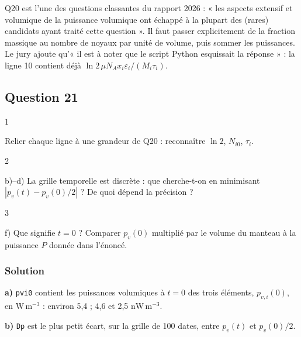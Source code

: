 \documentclass[11pt,a4paper]{article}
\begin{document}
\begin{jury}

Q20 est l'une des questions classantes du rapport 2026 : « les aspects extensif et volumique de la puissance volumique ont échappé à la plupart des (rares) candidats ayant traité cette question ». Il faut passer explicitement de la fraction massique au nombre de noyaux par unité de volume, puis sommer les puissances. Le jury ajoute qu'« il est à noter que le script Python esquissait la réponse » : la ligne 10 contient déjà \(\ln2\,\mu N_Ax_i\varepsilon_i/(M_i\tau_i)\).

\end{jury}

\hypertarget{question-21}{%
\subsection{Question 21}\label{question-21}}

\begin{indication}{1}

Relier chaque ligne à une grandeur de Q20 : reconnaître \(\ln2\), \(N_{i0}\), \(\tau_i\).

\end{indication}

\begin{indication}{2}

b)--d) La grille temporelle est discrète : que cherche-t-on en minimisant \(|p_v(t)-p_v(0)/2|\) ? De quoi dépend la précision ?

\end{indication}

\begin{indication}{3}

f) Que signifie \(t=0\) ? Comparer \(p_v(0)\) multiplié par le volume du manteau à la puissance \(P\) donnée dans l'énoncé.

\end{indication}

\hypertarget{solution-20}{%
\subsubsection{Solution}\label{solution-20}}

\textbf{a)} \texttt{pvi0} contient les puissances volumiques à \(t=0\) des trois éléments, \(p_{v,i}(0)\), en \(\mathrm{W\,m^{-3}}\) : environ 5,4 ; 4,6 et 2,5 \(\mathrm{nW\,m^{-3}}\).

\textbf{b)} \texttt{Dp} est le plus petit écart, sur la grille de 100 dates, entre \(p_v(t)\) et \(p_v(0)/2\).
\end{document}
